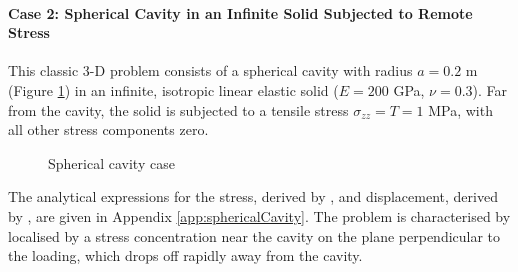 \documentclass[sn-mathphys,Numbered]{sn-jnl}%
\begin{document}
\paragraph{Case 2: Spherical Cavity in an Infinite Solid Subjected to Remote Stress}
This classic 3-D problem consists of a spherical cavity with radius $a = 0.2$ m (Figure \ref{fig:spherical_cavity}) in an infinite, isotropic linear elastic solid ($E = 200$ GPa, $\nu = 0.3$).
Far from the cavity, the solid is subjected to a tensile stress $\sigma_{zz} = T = 1$ MPa, with all other stress components zero.
\begin{figure}[htbp]
   \centering
   \caption{Spherical cavity case}
   \label{fig:spherical_cavity}
\end{figure}
The analytical expressions for the stress, derived by \citet{Southwell1926},  and displacement, derived by \citet{Goodier1933}, are given in Appendix \ref{app:sphericalCavity}.
The problem is characterised by localised by a stress concentration near the cavity on the plane perpendicular to the loading, which drops off rapidly away from the cavity.
\end{document}
